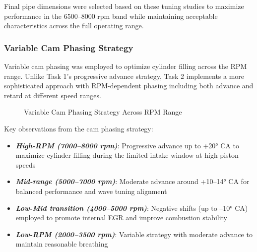 Final pipe dimensions were selected based on these tuning studies to maximize performance in the 6500--8000 rpm band while maintaining acceptable characteristics across the full operating range.

\subsubsection{Variable Cam Phasing Strategy}

Variable cam phasing was employed to optimize cylinder filling across the RPM range. Unlike Task 1's progressive advance strategy, Task 2 implements a more sophisticated approach with RPM-dependent phasing including both advance and retard at different speed ranges.

\begin{figure}[H]
    \centering
    \caption{Variable Cam Phasing Strategy Across RPM Range}
    \label{fig:task2_cam_phasing}
\end{figure}

Key observations from the cam phasing strategy:
\begin{itemize}
    \item \textbf{\textit{High-RPM (7000--8000 rpm)}}: Progressive advance up to +20° CA to maximize cylinder filling during the limited intake window at high piston speeds
    \item \textbf{\textit{Mid-range (5000--7000 rpm)}}: Moderate advance around +10--14° CA for balanced performance and wave tuning alignment
    \item \textbf{\textit{Low-Mid transition (4000--5000 rpm)}}: Negative shifts (up to --10° CA) employed to promote internal EGR and improve combustion stability
    \item \textbf{\textit{Low-RPM (2000--3500 rpm)}}: Variable strategy with moderate advance to maintain reasonable breathing
\end{itemize}

